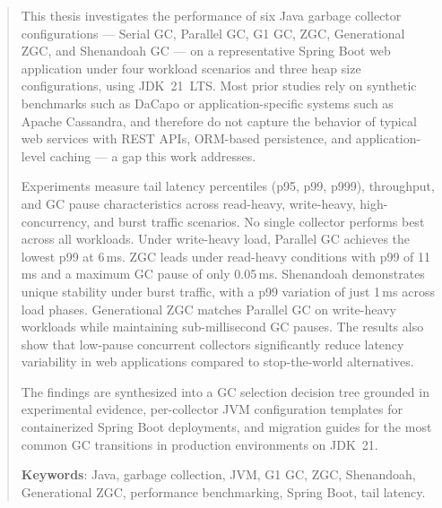\begin{abstract}

This thesis investigates the performance of six Java garbage collector
configurations --- Serial GC, Parallel GC, G1 GC, ZGC, Generational ZGC,
and Shenandoah GC --- on a representative Spring Boot web application under
four workload scenarios and three heap size configurations, using JDK~21~LTS.
Most prior studies rely on synthetic benchmarks such as DaCapo or
application-specific systems such as Apache Cassandra, and therefore do not
capture the behavior of typical web services with REST APIs, ORM-based
persistence, and application-level caching --- a gap this work addresses.

Experiments measure tail latency percentiles (p95, p99, p999), throughput,
and GC pause characteristics across read-heavy, write-heavy,
high-concurrency, and burst traffic scenarios. No single collector performs
best across all workloads. Under write-heavy load, Parallel GC achieves the
lowest p99 at 6\,ms. ZGC leads under read-heavy conditions with p99 of
11\,ms and a maximum GC pause of only 0.05\,ms. Shenandoah demonstrates
unique stability under burst traffic, with a p99 variation of just 1\,ms
across load phases. Generational ZGC matches Parallel GC on write-heavy
workloads while maintaining sub-millisecond GC pauses. The results also
show that low-pause concurrent collectors significantly reduce latency
variability in web applications compared to stop-the-world alternatives.

The findings are synthesized into a GC selection decision tree grounded in
experimental evidence, per-collector JVM configuration templates for
containerized Spring Boot deployments, and migration guides for the most
common GC transitions in production environments on JDK~21.

\textbf{Keywords}: Java, garbage collection, JVM, G1 GC, ZGC, Shenandoah,
Generational ZGC, performance benchmarking, Spring Boot, tail latency.

\end{abstract}
